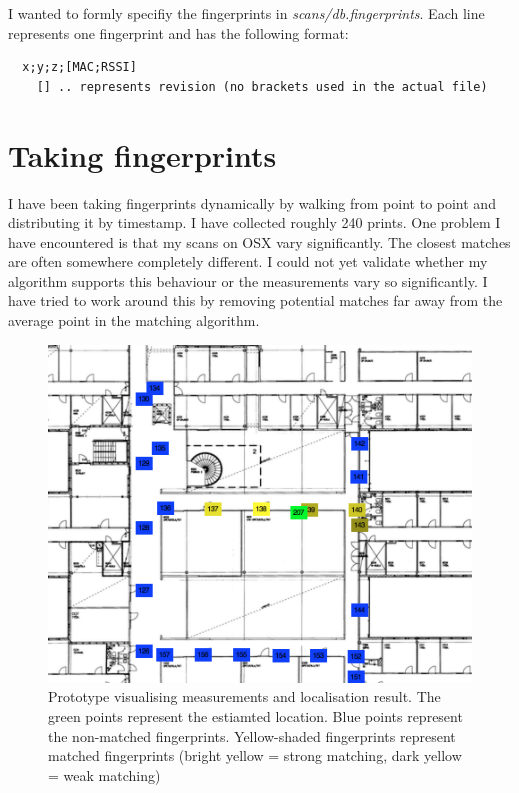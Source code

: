 \documentclass{article}
\begin{document}
I wanted to formly specifiy the fingerprints in \textit{scans/db.fingerprints}. Each line represents one fingerprint and has the following format:

\begin{verbatim}
  x;y;z;[MAC;RSSI]
    [] .. represents revision (no brackets used in the actual file)
\end{verbatim}

\section{Taking fingerprints}

I have been taking fingerprints dynamically by walking from point to point and distributing it by timestamp.
I have collected roughly 240 prints. One problem I have encountered is that my scans on OSX vary significantly. The closest matches are often somewhere completely different. I could not yet validate whether my algorithm supports this behaviour or the measurements vary so significantly. 
I have tried to work around this by removing potential matches far away from the average point in the matching algorithm.

\begin{figure}[h]
  \includegraphics[scale=0.7]{prototype}
  \caption{Prototype visualising measurements and localisation result. The green points represent the estiamted location. Blue points represent the non-matched fingerprints. Yellow-shaded fingerprints represent matched fingerprints (bright yellow = strong matching, dark yellow = weak matching)}
\end{figure}
\end{document}
